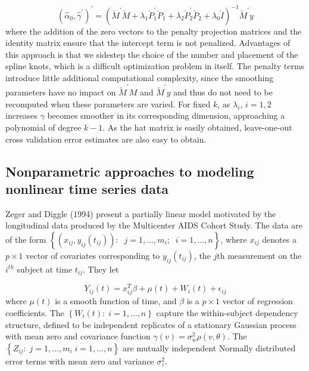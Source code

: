 \documentclass[12pt]{article}
\begin{document}
\begin{equation*}
\left( \hat{\alpha}_0, \hat{\gamma}^\prime \right)^\prime = \left( \breve{M}^\prime \breve{M} + \lambda_1 \breve{P}_1^\prime \breve{P}_1 + \lambda_2 \breve{P}_2^\prime \breve{P}_2 + \lambda_0\breve{I}\right)^{-1}\breve{M}^\prime y
\end{equation*} 
\noindent
where the addition of the zero vectors to the penalty projection matrices and the identity matrix ensure that the intercept term is not penalized. Advantages of this approach is that we sidestep the choice of the number and placement of the spline knots, which is a difficult optimization problem in itself. The penalty terms introduce little additional computational complexity, since the smoothing parameters have no impact on $\tilde{M}^\prime M$ and $\tilde{M}^\prime y$ and thus do not need to be recomputed when these parameters are varied. For fixed $k$, as $\lambda_i$, $i=1,2$ increases $\gamma$ becomes smoother in its corresponding dimension, approaching a polynomial of degree $k-1$. As the hat matrix is easily obtained, leave-one-out cross validation   error estimates are also easy to obtain.  



















\subsection{Nonparametric approaches to modeling nonlinear time series data}

Zeger and Diggle (1994) present a partially linear model motivated by the longitudinal data produced by the Multicenter AIDS Cohort Study. The data are of the form $\left\{ \left(x_{ij},y_{ij}\left(t_{ij}\right)\right): \;\; j=1,\dots,m_i;\;\;i=1,\dots,n \right\}$, where $x_{ij}$ denotes a $p \times 1$ vector of covariates corresponding to $y_{ij}\left(t_{ij}\right)$, the $j$th measurement on the $i^{th}$ subject at time $t_{ij}$. They let 

\begin{equation} \label{eq:zeger_diggle_VC_model}
Y_{ij}\left(t\right) =  x_{ij}^T\beta + \mu\left(t\right) + W_i\left(t\right) + \epsilon_{ij}
\end{equation}
\noindent
where $\mu\left(t\right)$ is a smooth function of time, and $\beta$ is a $p \times 1$ vector of regression coefficients. The $\left\{ W_i\left(t\right):\;i=1,\dots,n \right\}$ capture the within-subject dependency structure, defined to be independent replicates of a stationary Gaussian process with mean zero and covariance function $\gamma\left(v\right) = \sigma_w^2\rho\left(v, \theta \right)$. The $\left\{ Z_{ij}:\;j=1,\dots,m_i\;i=1,\dots,n \right\}$ are mutually independent Normally distributed error terms with mean zero and variance $\sigma_z^2$.
\end{document}
